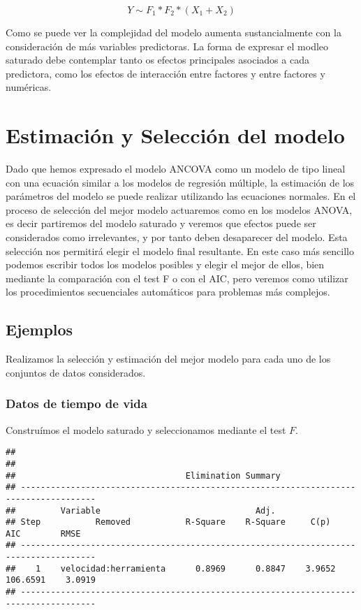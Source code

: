 \documentclass[
]{book}
\theoremstyle{definition}
\theoremstyle{definition}
\theoremstyle{definition}
\theoremstyle{remark}
\begin{document}
\[Y \sim F_1*F_2*(X_1 + X_2)\]

Como se puede ver la complejidad del modelo aumenta sustancialmente con la consideración de más variables predictoras. La forma de expresar el modleo saturado debe contemplar tanto os efectos principales asociados a cada predictora, como los efectos de interacción entre factores y entre factores y numéricas.

\hypertarget{estimaciuxf3n-y-selecciuxf3n-del-modelo}{%
\section{Estimación y Selección del modelo}\label{estimaciuxf3n-y-selecciuxf3n-del-modelo}}

Dado que hemos expresado el modelo ANCOVA como un modelo de tipo lineal con una ecuación similar a los modelos de regresión múltiple, la estimación de los parámetros del modelo se puede realizar utilizando las ecuaciones normales. En el proceso de selección del mejor modelo actuaremos como en los modelos ANOVA, es decir partiremos del modelo saturado y veremos que efectos puede ser considerados como irrelevantes, y por tanto deben desaparecer del modelo. Esta selección nos permitirá elegir el modelo final resultante. En este caso más sencillo podemos escribir todos los modelos posibles y elegir el mejor de ellos, bien mediante la comparación con el test F o con el AIC, pero veremos como utilizar los procedimientos secuenciales automáticos para problemas más complejos.

\hypertarget{ejemplos}{%
\subsection{Ejemplos}\label{ejemplos}}

Realizamos la selección y estimación del mejor modelo para cada uno de los conjuntos de datos considerados.

\hypertarget{datos-de-tiempo-de-vida}{%
\subsubsection{Datos de tiempo de vida}\label{datos-de-tiempo-de-vida}}

Construímos el modelo saturado y seleccionamos mediante el test \(F\).

\begin{verbatim}
## 
## 
##                                  Elimination Summary                                  
## -------------------------------------------------------------------------------------
##         Variable                               Adj.                                      
## Step           Removed           R-Square    R-Square     C(p)       AIC        RMSE     
## -------------------------------------------------------------------------------------
##    1    velocidad:herramienta      0.8969      0.8847    3.9652    106.6591    3.0919    
## -------------------------------------------------------------------------------------
\end{verbatim}
\end{document}
